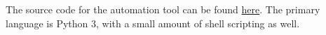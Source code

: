 The source code for the automation tool can be found \href{https://bitbucket.org/byu-vv/bpmn-cwp-verification/src/main/code/}{here}. The primary language is Python 3, with a small amount of shell scripting as well. 